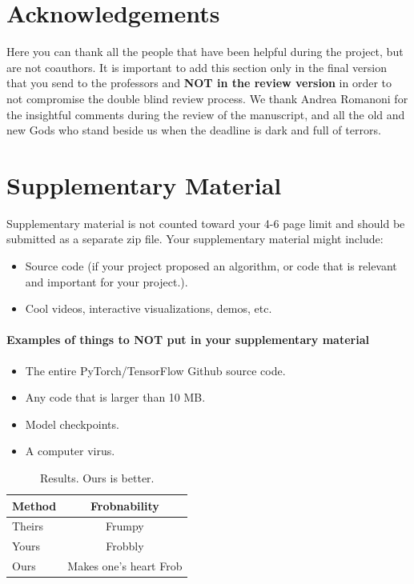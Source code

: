 \documentclass[10pt,twocolumn,letterpaper]{article}
\begin{document}
\section*{Acknowledgements}
Here you can thank all the people that have been helpful during the project, but are not coauthors. It is important to add this section only in the final version that you send to the professors and \textbf{NOT in the review version} in order to not compromise the double blind review process. We thank Andrea Romanoni for the insightful comments during the review of the manuscript, and all the old and new Gods who stand beside us when the deadline is dark and full of terrors. 

\appendix
\section{Supplementary Material} 
Supplementary material is not counted toward your 4-6 page limit and should be submitted as a separate zip file. Your supplementary material might include:
\begin{itemize}
    \item Source code (if your project proposed an algorithm, or code that is relevant and important for your project.).
    \item Cool videos, interactive visualizations, demos, etc.
\end{itemize}

\paragraph{Examples of things to NOT put in your supplementary material}
\begin{itemize}
    \item The entire PyTorch/TensorFlow Github source code.
    \item Any code that is larger than 10 MB.
    \item Model checkpoints.
    \item A computer virus.
\end{itemize}


\begin{table}
\begin{center}
\begin{tabular}{|l|c|}
\hline
Method & Frobnability \\
\hline\hline
Theirs & Frumpy \\
Yours & Frobbly \\
Ours & Makes one's heart Frob\\
\hline
\end{tabular}
\end{center}
\caption{Results.   Ours is better.}
\end{table}




{\small


}
\end{document}
